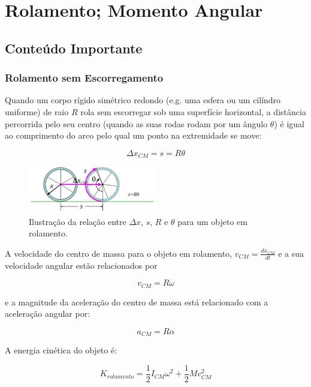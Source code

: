 \section{Rolamento; Momento Angular}
\subsection{Conteúdo Importante}
\subsubsection{Rolamento sem Escorregamento}

Quando um corpo rígido simétrico redondo (e.g. uma esfera ou um cilíndro uniforme) de raio $R$ rola sem escorregar sob uma superfície horizontal, a distância percorrida pelo seu centro (quando as suas rodas rodam por um ângulo $\theta$) é igual ao comprimento do arco pelo qual um ponto na extremidade se move:

\begin{equation}
    \Delta x_{CM}=s=R\theta
\end{equation}

\begin{figure}[h!]
    \centering
    \includegraphics[width=0.5\textwidth]{8/fig/rolSemEscor.png}
    \caption{Ilustração da relação entre $\Delta x$, $s$, $R$ e $\theta$ para um objeto em rolamento.}
\end{figure}

A velocidade do centro de massa para o objeto em rolamento, $v_{CM}=\frac{dx_{CM}}{dt}$ e a sua velocidade angular estão relacionados por

\begin{equation}
    v_{CM}=R\omega
\end{equation}

e a magnitude da aceleração do centro de massa está relacionado com a aceleração angular por:

\begin{equation}
    a_{CM}=R\alpha
\end{equation}

A energia cinética do objeto é:

\begin{equation}
    K_{rolamento}=\frac{1}{2}I_{CM}\omega^2+\frac{1}{2}Mv^2_{CM}
\end{equation}

